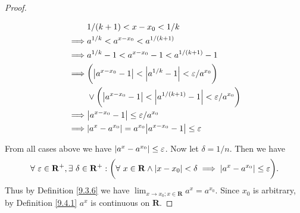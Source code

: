 \begin{proof}
\begin{enumerate}
              \begin{align*}
                           & 1 / (k + 1) < x - x_0 < 1 / k                                                                \\
                  \implies & a^{1 / k} < a^{x - x_0} < a^{1 / (k + 1)}                                                    \\
                  \implies & a^{1 / k} - 1 < a^{x - x_0} - 1 < a^{1 / (k + 1)} - 1                                        \\
                  \implies & \bigg(\abs*{a^{x - x_0} - 1} < \abs*{a^{1 / k} - 1} < \varepsilon / a^{x_0}\bigg)            \\
                           & \lor \bigg(\abs*{a^{x - x_0} - 1} < \abs*{a^{1 / (k + 1)} - 1} < \varepsilon / a^{x_0}\bigg) \\
                  \implies & \abs*{a^{x - x_0} - 1} \leq \varepsilon / a^{x_0}                                            \\
                  \implies & \abs*{a^x - a^{x_0}} = a^{x_0} \abs*{a^{x - x_0} - 1} \leq \varepsilon                       \\
              \end{align*}
    \end{enumerate}
    From all cases above we have \(\abs*{a^x - a^{x_0}} \leq \varepsilon\).
    Now let \(\delta = 1 / n\).
    Then we have
    \[
        \forall\ \varepsilon \in \mathbf{R}^+, \exists\ \delta \in \mathbf{R}^+ : \bigg(\forall\ x \in \mathbf{R} \land \abs*{x - x_0} < \delta \implies \abs*{a^x - a^{x_0}} \leq \varepsilon\bigg).
    \]
    Thus by Definition \ref{9.3.6} we have \(\lim_{x \to x_0 ; x \in \mathbf{R}} a^x = a^{x_0}\).
    Since \(x_0\) is arbitrary, by Definition \ref{9.4.1} \(a^x\) is continuous on \(\mathbf{R}\).
\end{proof}

\begin{exercise}\label{ex 9.4.2}

\end{exercise}